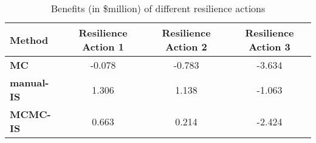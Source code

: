 \begin{table}[h]
    \centering
    \caption{Benefits (in \$million) of different resilience actions}
    \begin{tabular}{lccc}
        \hline
        \textbf{Method} & \textbf{Resilience Action 1} & \textbf{Resilience Action 2} & \textbf{Resilience Action 3} \\ \hline
        \textbf{MC} & -0.078 & -0.783 & -3.634 \\ 
        \textbf{manual-IS} & 1.306 & 1.138 & -1.063 \\ 
        \textbf{MCMC-IS} & 0.663 & 0.214 & -2.424 \\ \hline
    \end{tabular}
    \label{tab:cost_benefit}
\end{table}

